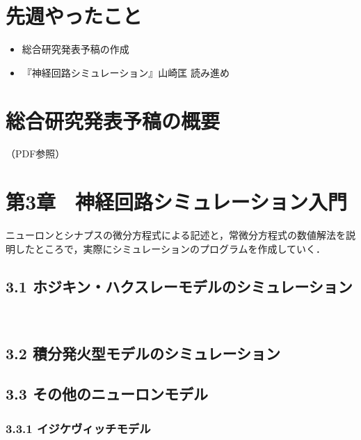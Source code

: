 \documentclass[dvipdfmx, A4j, twocolumn, 10.5pt]{jsarticle}
\begin{document}


\section{先週やったこと}
\begin{itemize}
 \item 総合研究発表予稿の作成
 \item 『神経回路シミュレーション』山崎匡 読み進め

\end{itemize}
\section{総合研究発表予稿の概要}
（PDF参照）

\iffalse
 

\section*{第3章　神経回路シミュレーション入門}

ニューロンとシナプスの微分方程式による記述と，常微分方程式の数値解法を説明したところで，実際にシミュレーションのプログラムを作成していく．


\subsection*{3.1 ホジキン・ハクスレーモデルのシミュレーション}
　

\subsection*{3.2 積分発火型モデルのシミュレーション}
\subsection*{3.3 その他のニューロンモデル}
\subsubsection*{3.3.1 イジケヴィッチモデル}
\end{document}

